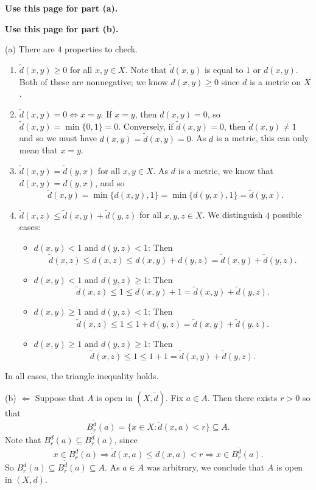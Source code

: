 \documentclass[12pt]{article}
\newcommand{\writespace}[1]{\vspace*{#1}}
\newcommand{\fullproofpage}[2]{%
  \begin{tcolorbox}[
    enhanced,
    colback=white,
    colframe=gray!60!black,
    fonttitle=\bfseries,
    title={Pass 5 -- Full Proof Attempt\hfill #1},
    height=8.45in
  ]
  \textbf{#2}

  \writespace{7.65in}
  \end{tcolorbox}
}
\newenvironment{solutionbox}[1]{%
  \begin{tcolorbox}[
    enhanced,
    breakable,
    colback=solgreen,
    colframe=green!45!black,
    fonttitle=\bfseries,
    title={#1}
  ]
}{%
  \end{tcolorbox}
}
\begin{document}
\newpage
\fullproofpage{Homework 8, Problem 4}{Use this page for part (a).}

\newpage
\fullproofpage{Homework 8, Problem 4}{Use this page for part (b).}

\newpage
\begin{solutionbox}{Official Solution (Professor)}
(a) There are \(4\) properties to check.
\begin{enumerate}[label=\arabic*.]
  \item \(\widetilde d(x,y)\ge0\) for all \(x,y\in X\). Note that \(\widetilde d(x,y)\) is equal to \(1\) or \(d(x,y)\). Both of these are nonnegative; we know \(d(x,y)\ge0\) since \(d\) is a metric on \(X\).
  \item \(\widetilde d(x,y)=0\Longleftrightarrow x=y\). If \(x=y\), then \(d(x,y)=0\), so \(\widetilde d(x,y)=\min\{0,1\}=0\). Conversely, if \(\widetilde d(x,y)=0\), then \(\widetilde d(x,y)\ne1\) and so we must have \(d(x,y)=\widetilde d(x,y)=0\). As \(d\) is a metric, this can only mean that \(x=y\).
  \item \(\widetilde d(x,y)=\widetilde d(y,x)\) for all \(x,y\in X\). As \(d\) is a metric, we know that \(d(x,y)=d(y,x)\), and so
  \[
    \widetilde d(x,y)=\min\{d(x,y),1\}=\min\{d(y,x),1\}=\widetilde d(y,x).
  \]
  \item \(\widetilde d(x,z)\le \widetilde d(x,y)+\widetilde d(y,z)\) for all \(x,y,z\in X\). We distinguish \(4\) possible cases:
  \begin{itemize}
    \item \(d(x,y)<1\) and \(d(y,z)<1\): Then
    \[
      \widetilde d(x,z)\le d(x,z)\le d(x,y)+d(y,z)=\widetilde d(x,y)+\widetilde d(y,z).
    \]
    \item \(d(x,y)<1\) and \(d(y,z)\ge1\): Then
    \[
      \widetilde d(x,z)\le1\le d(x,y)+1=\widetilde d(x,y)+\widetilde d(y,z).
    \]
    \item \(d(x,y)\ge1\) and \(d(y,z)<1\): Then
    \[
      \widetilde d(x,z)\le1\le1+d(y,z)=\widetilde d(x,y)+\widetilde d(y,z).
    \]
    \item \(d(x,y)\ge1\) and \(d(y,z)\ge1\): Then
    \[
      \widetilde d(x,z)\le1\le1+1=\widetilde d(x,y)+\widetilde d(y,z).
    \]
  \end{itemize}
\end{enumerate}
In all cases, the triangle inequality holds.

(b) \(\Leftarrow\) Suppose that \(A\) is open in \((X,\widetilde d)\). Fix \(a\in A\). Then there exists \(r>0\) so that
\[
  B_r^{\widetilde d}(a)=\{x\in X:\widetilde d(x,a)<r\}\subseteq A.
\]
Note that \(B_r^d(a)\subseteq B_r^{\widetilde d}(a)\), since
\[
  x\in B_r^d(a)
  \Longrightarrow
  \widetilde d(x,a)\le d(x,a)<r
  \Longrightarrow
  x\in B_r^{\widetilde d}(a).
\]
So \(B_r^d(a)\subseteq B_r^{\widetilde d}(a)\subseteq A\). As \(a\in A\) was arbitrary, we conclude that \(A\) is open in \((X,d)\).


\end{solutionbox}
\end{document}
